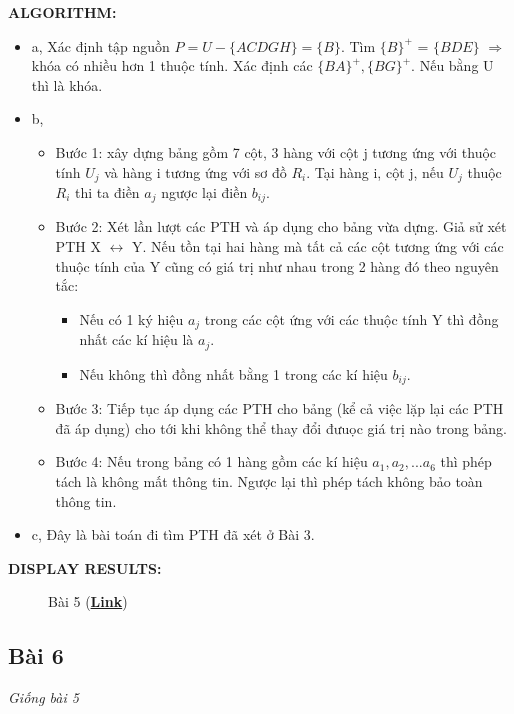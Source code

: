\documentclass[12pt,a4paper]{report}
\begin{document}
	{\bf ALGORITHM:}
	\begin{itemize}
		\item a, Xác định tập nguồn $P = U - \{ACDGH\}=\{B\}$. Tìm $\{B\}^+$ = $\{BDE\}$ $\Rightarrow$ khóa có nhiều hơn 1 thuộc tính. Xác định các $\{BA\}^+,\{BG\}^+$. Nếu bằng U thì là khóa.
		\item b,
		\begin{itemize}
			\item Bước 1: xây dựng bảng gồm 7 cột, 3 hàng với cột j tương ứng với thuộc tính $U_j$ và hàng i tương ứng với sơ đồ $R_i$. Tại hàng i, cột j, nếu $U_j$ thuộc $R_i$ thi ta điền $a_j$ ngược lại điền $b_{ij}$.
			\item Bước 2: Xét lần lượt các PTH và áp dụng cho bảng vừa dựng. Giả sử xét PTH X $\longleftrightarrow$ Y. Nếu tồn tại hai hàng mà tất cả các cột tương ứng với các thuộc tính của Y cũng có giá trị như nhau trong 2 hàng đó theo nguyên tắc:
			\begin{itemize}
				\item Nếu có 1 ký hiệu $a_j$ trong các cột ứng với các thuộc tính Y thì đồng nhất các kí hiệu là $a_j$.
				\item Nếu không thì đồng nhất bằng 1 trong các kí hiệu $b_{ij}$.
			\end{itemize}
			\item Bước 3: Tiếp tục áp dụng các PTH cho bảng (kể cả việc lặp lại các PTH đã áp dụng) cho tới khi không thể thay đổi đưuọc giá trị nào trong bảng.
			\item Bước 4: Nếu trong bảng có 1 hàng gồm các kí hiệu $a_1,a_2,...a_6$ thì phép tách là không mất thông tin. Ngược lại thì phép tách không bảo toàn thông tin.
		\end{itemize}
		\item c, Đây là bài toán đi tìm PTH đã xét ở Bài 3.
	\end{itemize}

	{\bf DISPLAY RESULTS:}
		\begin{figure}[!h]
		\hfill
		\hfill
		\caption{Bài 5 (\href{https://drive.google.com/drive/folders/18bppOD8kB9FX16mTBPA5vzgMh5qRWkda}{\bf Link})}
		\end{figure}


\newpage
\subsection{Bài 6}
	\begin{center}
		{\it Giống bài 5}
	\end{center}
\end{document}
